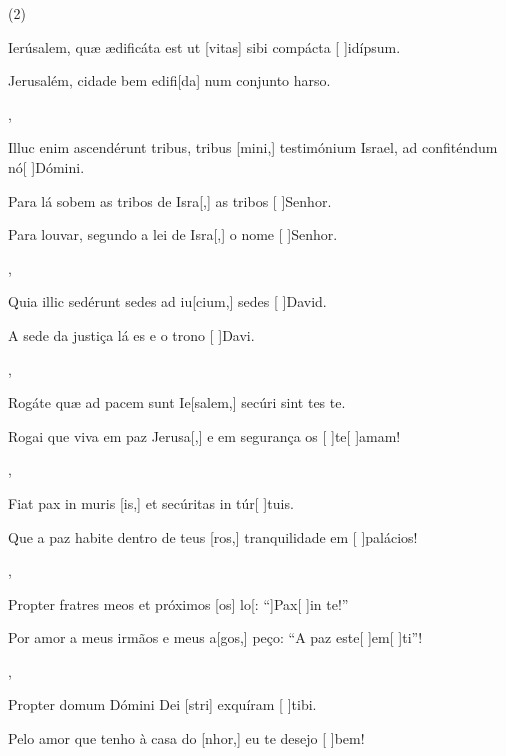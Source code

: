 \SetVersePairs(2){
  {\item {}Ierúsalem, quæ ædificáta est ut [vitas] sibi compácta [ ]{id}{íp}sum.~\Responsorium}%
    {\item {}Jerusalém, cidade bem edifi[da] num conjunto harso.~\Responsorium},
  {\item {}Illuc enim ascendérunt tribus, tribus [mini,] testimónium Israel, ad confiténdum nó[ ]{Dó}mini.~\Responsorium}%
    {\item {}Para lá sobem as tribos de Isra[,] as tribos [ ]{Se}{nhor}.~\Responsorium
    \item {}Para louvar, segundo a lei de Isra[,] o nome [ ]{Se}{nhor}.~\Responsorium},
  {\item {}Quia illic sedérunt sedes ad iu[cium,] sedes [ ]{Da}\-vid.~\Responsorium}%
    {\item {}A sede da justiça lá es e o trono [ ]{Da}{vi}.~\Responsorium},
  {\item {}Rogáte quæ ad pacem sunt Ie[salem,] secúri sint \-tes te.~\Responsorium}%
    {\item {}Rogai que viva em paz Jerusa[,] e em segurança os [ ]{te}[ ]{a}mam!~\Responsorium},
  {\item {}Fiat pax in muris [is,] et secúritas in túr[ ]{tu}is.~\Responsorium}%
    {\item {}Que a paz habite dentro de teus [ros,] tranquilidade em [ ]{pa}{lá}cios!~\Responsorium},
  {\item {}Propter fratres meos et próximos [os] lo[: ``]{Pax}[ ]{in} te!''~\Responsorium}%
    {\item {}Por amor a meus irmãos e meus a[gos,] peço: ``A paz este[ ]{em}[ ]{ti}''!~\Responsorium},
  {\item {}Propter domum Dómini Dei [stri] exquíram [ ]{ti}bi.~\Responsorium}%
    {\item {}Pelo amor que tenho à casa do [nhor,] eu te desejo [ ]{bem}!~\Responsorium}
}